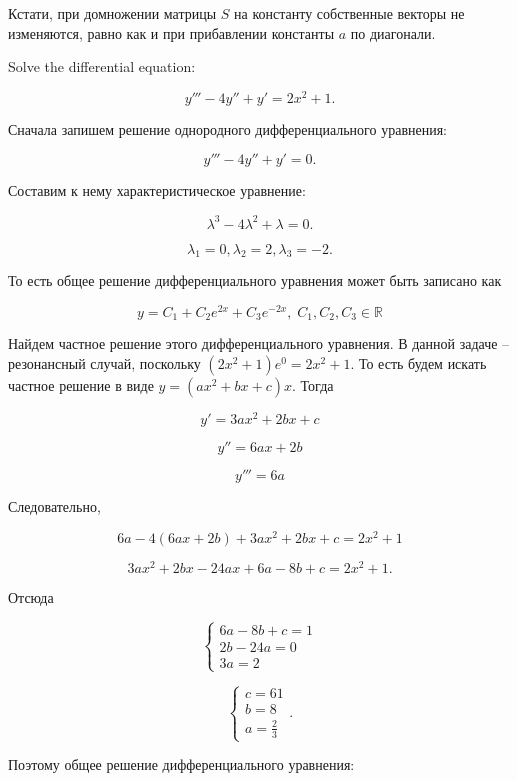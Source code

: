 \documentclass[addpoints, answers]{exam} %
\newcommand{\RR}{\mathbb{R}}
\begin{document}
\begin{questions}
\begin{parts}
\begin{solution}
Кстати, при домножении матрицы $S$ на константу собственные векторы не изменяются, равно как и при прибавлении константы $a$ по диагонали.
\end{solution}


\end{parts}

\question Solve the  differential equation:

\[
y''' -4y'' +y' =2x^{2} +1.
\]

\begin{solution}
Сначала запишем решение однородного дифференциального уравнения:

\[y''' -4y'' +y' =0.\]

Составим к нему характеристическое уравнение:

  \[\lambda ^{3} -4\lambda ^{2} +\lambda =0.\]

  \[\lambda _{1} =0,\lambda _{2} =2,\lambda _{3} =-2.\]

  То есть общее решение дифференциального уравнения может быть записано как

  \[y=C_{1} +C_{2} e^{2x} +C_{3} e^{-2x},\; C_{1} ,C_{2} ,C_{3} \in \RR \]

  Найдем частное решение этого дифференциального уравнения. В данной задаче -- резонансный случай, поскольку $\left(2x^{2} +1\right)e^{0} =2x^{2} +1$. То есть будем искать частное решение в виде $y=(ax^{2} +bx+c)x$. Тогда

  \[y' =3ax^{2} +2bx+c\]

  \[y'' =6ax+2b\]

  \[y''' =6a\]

  Следовательно,

  \[6a-4(6ax+2b)+3ax^{2} +2bx+c=2x^{2} +1\]

  \[3ax^{2} +2bx-24ax+6a-8b+c=2x^{2} +1.\]

  Отсюда

  \[\left\{\begin{array}{l} {6a-8b+c=1} \\ {2b-24a=0} \\ {3a=2} \end{array}\right. \]

  \[\left\{\begin{array}{l} {c=61} \\ {b=8} \\ {a=\frac{2}{3} } \end{array}\right. .\]

  Поэтому общее решение дифференциального уравнения:


\end{solution}
\end{questions}
\end{document}
